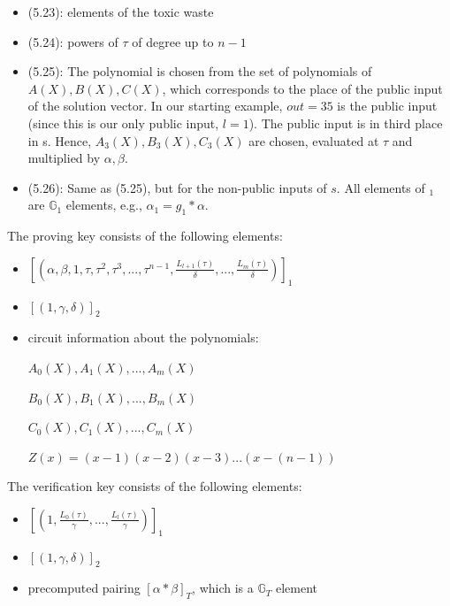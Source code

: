 \begin{itemize}
    \item (5.23): elements of the toxic waste
    \item (5.24): powers of \begin{math}\tau\end{math} of degree up to \(n-1\)
    \item (5.25): The polynomial is chosen from the set of polynomials of \(A(X), B(X), C(X)\), which corresponds to the place of the public input of the solution vector. In our starting example, \(out = 35\) is the public input (since this is our only public input, \(l=1\)). The public input is in third place in s. Hence, \(A_3(X), B_3(X), C_3(X)\) are chosen, evaluated at \begin{math}\tau\end{math} and multiplied by \begin{math} \alpha, \beta\end{math}.
    \item (5.26): Same as (5.25), but for the non-public inputs of \(s\). All elements of \begin{math} [\sigma_1]_1 \end{math} are \begin{math}\mathbb{G}_1\end{math} elements, e.g., \begin{math}\alpha_1 = g_1 * \alpha\end{math}.
\end{itemize}

The proving key consists of the following elements:
\begin{itemize}
    \item \([(\alpha, \beta, 1, \tau, \tau^2, \tau^3, ..., \tau^{n-1}, \frac{L_{l+1}(\tau)}{\delta}, ..., \frac{L_m(\tau)}{\delta})]_1\)
    \item \([(1, \gamma, \delta)]_2\)
    \item circuit information about the polynomials:
    
    \(A_0(X), A_1(X), ..., A_m(X)\)
    
    \(B_0(X), B_1(X), ..., B_m(X)\)
    
    \(C_0(X), C_1(X), ..., C_m(X)\)
    
    \(Z(x) = (x-1)(x-2)(x-3)...(x-(n-1))\)
\end{itemize}

The verification key consists of the following elements:
\begin{itemize}
    \item \([(1, \frac{L_0(\tau)}{\gamma}, ..., \frac{L_l(\tau)}{\gamma})]_1\)
    \item \([(1, \gamma, \delta)]_2\)
    \item precomputed pairing \([\alpha * \beta]_T\), which is a \begin{math}\mathbb{G}_T\end{math} element
\end{itemize}

